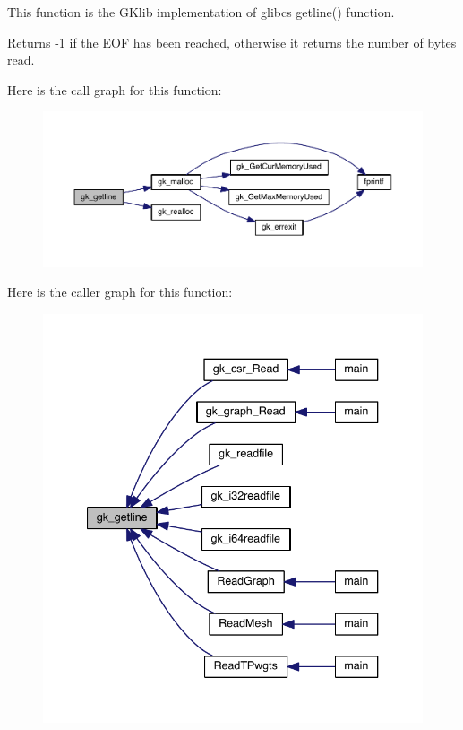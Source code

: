 This function is the G\+Klib implementation of glibc\textquotesingle{}s getline() function. \begin{DoxyReturn}{Returns}
-\/1 if the E\+OF has been reached, otherwise it returns the number of bytes read. 
\end{DoxyReturn}
Here is the call graph for this function\+:\nopagebreak
\begin{figure}[H]
\begin{center}
\leavevmode
\includegraphics[width=350pt]{a00077_ad8263f64108434d7ebab9799b5ab9632_cgraph}
\end{center}
\end{figure}
Here is the caller graph for this function\+:\nopagebreak
\begin{figure}[H]
\begin{center}
\leavevmode
\includegraphics[width=340pt]{a00077_ad8263f64108434d7ebab9799b5ab9632_icgraph}
\end{center}
\end{figure}
\mbox{\label{a00077_a656fd5266ae12a96e53125486f8fea52}} 
